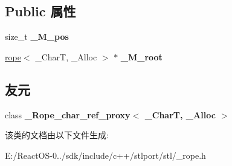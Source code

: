 \subsection*{Public 属性}
\begin{DoxyCompactItemize}
\item 
\mbox{\label{class___rope__char__ptr__proxy_ac29348be5e67ea0ad3154eed168b6f84}} 
size\+\_\+t {\bfseries \+\_\+\+M\+\_\+pos}
\item 
\mbox{\label{class___rope__char__ptr__proxy_a4fa01b0351bdb4979792a05e0e5ebb7e}} 
\hyperlink{classrope}{rope}$<$ \+\_\+\+CharT, \+\_\+\+Alloc $>$ $\ast$ {\bfseries \+\_\+\+M\+\_\+root}
\end{DoxyCompactItemize}
\subsection*{友元}
\begin{DoxyCompactItemize}
\item 
\mbox{\label{class___rope__char__ptr__proxy_aa766e2447cd90065171dff449cea0994}} 
class {\bfseries \+\_\+\+Rope\+\_\+char\+\_\+ref\+\_\+proxy$<$ \+\_\+\+Char\+T, \+\_\+\+Alloc $>$}
\end{DoxyCompactItemize}


该类的文档由以下文件生成\+:\begin{DoxyCompactItemize}
\item 
E\+:/\+React\+O\+S-\/0../sdk/include/c++/stlport/stl/\+\_\+rope.\+h\end{DoxyCompactItemize}
